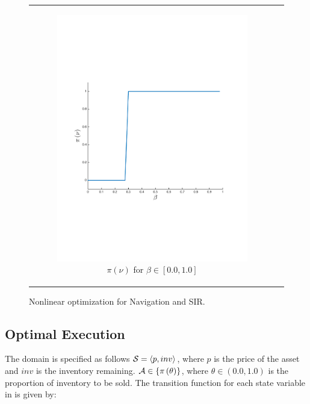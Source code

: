 \documentclass[letterpaper]{article}
\begin{document}
{\begin{figure}[]
\begin{tabular}{cc}
\begin{subfigure}{0.45\columnwidth}
                \includegraphics[width=\columnwidth,height=0.12\textheight]{sir_opt_new}
                \caption{{\footnotesize $ \pi(\nu) $} for {\footnotesize $ \beta \in \left[ 0.0, 1.0 \right] $}}
                \label{fig:sir_opt}
            \end{subfigure}
            \\
        \end{tabular}
        \caption{Nonlinear optimization for Navigation and SIR.}        
        \label{tab:opt_results}
    \end{figure}
}

\subsection{Optimal Execution}
\label{sec:results_oe}

The domain is specified as follows {\footnotesize $ \mathcal{S} = \left\langle p, inv \right\rangle$}, where $ p $ is the price of the asset and $ inv $ is the inventory remaining. {\footnotesize $ \mathcal{A} \in \left\lbrace \pi\left( \theta \right) \right\rbrace$}, where {\footnotesize $ \theta \in \left( 0.0, 1.0\right)$} is the proportion of inventory to be sold. The transition function {\footnotesize \Transition} for each state variable in {\footnotesize \State} is given by:
\end{document}

